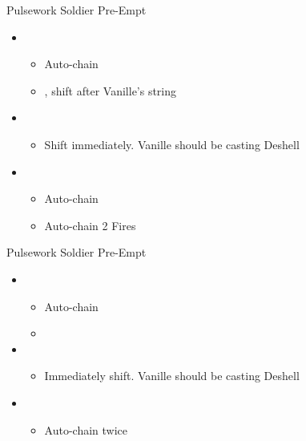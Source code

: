 \begin{paracol}{2}
\begin{battle}{Pulsework Soldier Pre-Empt}
		\begin{itemize}
			\item \first
			      \begin{itemize}
				      \item Auto-chain
				      \item \stagger, shift after Vanille's string
			      \end{itemize}
			\item \fourth
			      \begin{itemize}
				      \item Shift immediately. Vanille should be casting Deshell
			      \end{itemize}
			\item \first
			      \begin{itemize}
				      \item Auto-chain
				      \item Auto-chain 2 Fires
			      \end{itemize}
		\end{itemize}
	\end{battle}
	\switchcolumn
	\begin{battle}{Pulsework Soldier Pre-Empt}
		\begin{itemize}
			\item \first
			      \begin{itemize}
				      \item Auto-chain
				      \item \stagger
			      \end{itemize}
			\item \fourth
			      \begin{itemize}
				      \item Immediately shift. Vanille should be casting Deshell
			      \end{itemize}
			\item \first
			      \begin{itemize}
				      \item Auto-chain twice
			      \end{itemize}
		\end{itemize}
	\end{battle}



\end{paracol}
